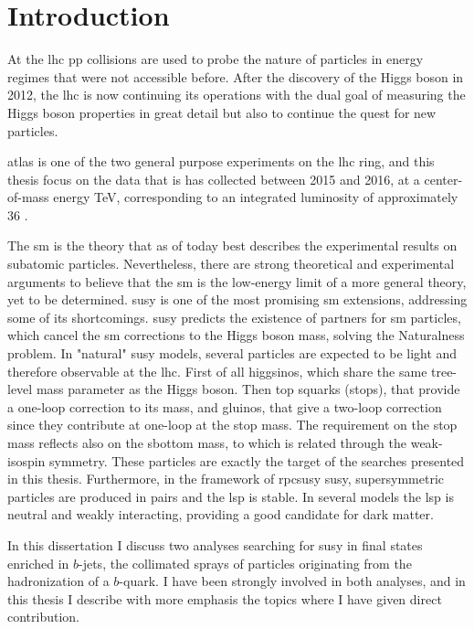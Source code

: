 \chapter*{Introduction}

At the \gls{lhc} \gls{pp} collisions are used to probe the nature of particles in energy regimes that were not accessible before. 
After the discovery of the Higgs boson in 2012, the \gls{lhc} is now continuing its operations with the dual goal 
of measuring the Higgs boson properties in great detail but also to continue the quest for new particles.

\gls{atlas} is one of the two general purpose experiments on the \gls{lhc} ring, and this thesis focus on the data that is has collected between 
2015 and 2016, 
at a center-of-mass energy \cmtre TeV, corresponding to an 
integrated luminosity of approximately 36 \ifb. 

The \gls{sm} is the theory that as of today best describes the experimental results on subatomic particles. 
Nevertheless, there are strong theoretical and experimental arguments to believe that the \gls{sm} is the low-energy limit 
of a more general theory, yet to be determined. 
\gls{susy} is one of the most promising \gls{sm} extensions, 
addressing some of its shortcomings. \gls{susy} predicts the existence of partners for  
\gls{sm} particles, which cancel the \gls{sm} corrections to the Higgs boson mass, solving the Naturalness problem. 
In "natural" \gls{susy} models, several particles are expected to be light and therefore observable at the \gls{lhc}.
First of all higgsinos, which share the same tree-level mass parameter as the Higgs boson. 
Then top squarks (stops), that provide a one-loop correction to its mass, and gluinos, that give a two-loop correction since they contribute 
at one-loop at the stop mass. 
The requirement on the stop mass reflects also on the sbottom mass, to which is related through the weak-isospin symmetry. 
These particles are exactly the target of the searches presented in this thesis.
Furthermore, in the framework of \gls{rpcsusy} \gls{susy}, supersymmetric particles are produced in pairs and the 
\gls{lsp} is stable. 
In several models the \gls{lsp} is neutral and weakly interacting, providing a good candidate for dark matter.
 

In this dissertation I discuss two analyses searching for \gls{susy} in final states enriched in $b$-jets, the collimated sprays of 
particles originating from the hadronization of a $b$-quark. 
I have been strongly involved in both analyses, 
and in this thesis I describe with more emphasis the topics where I have given direct contribution.

